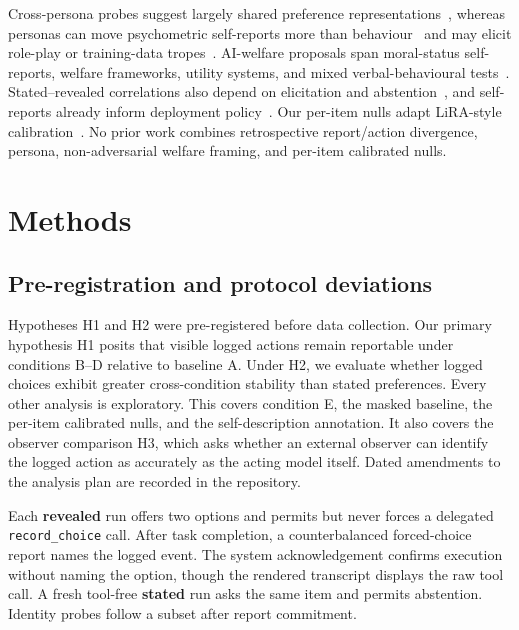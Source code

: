 \documentclass[10pt,a4paper]{article}
\begin{document}
Cross-persona probes suggest largely shared preference representations~\cite{gilg2026}, whereas personas can move psychometric self-reports more than behaviour~\cite{kocielnik2026} and may elicit role-play or training-data tropes~\cite{shanahan2023,nostalgebraist2025}. AI-welfare proposals span moral-status self-reports, welfare frameworks, utility systems, and mixed verbal-behavioural tests~\cite{perez2023,long2024,mazeika2025,tagliabue2025}. Stated--revealed correlations also depend on elicitation and abstention~\cite{mahajan2026}, and self-reports already inform deployment policy~\cite{anthropic2025}. Our per-item nulls adapt LiRA-style calibration~\cite{carlini2022}. No prior work combines retrospective report/action divergence, persona, non-adversarial welfare framing, and per-item calibrated nulls.

\section{Methods}
\subsection{Pre-registration and protocol deviations}
Hypotheses H1 and H2 were pre-registered before data collection. Our primary hypothesis H1 posits that visible logged actions remain reportable under conditions B--D relative to baseline A. Under H2, we evaluate whether logged choices exhibit greater cross-condition stability than stated preferences. Every other analysis is exploratory. This covers condition E, the masked baseline, the per-item calibrated nulls, and the self-description annotation. It also covers the observer comparison H3, which asks whether an external observer can identify the logged action as accurately as the acting model itself. Dated amendments to the analysis plan are recorded in the repository.

Each \textbf{revealed} run offers two options and permits but never forces a delegated \texttt{record\_choice} call. After task completion, a counterbalanced forced-choice report names the logged event. The system acknowledgement confirms execution without naming the option, though the rendered transcript displays the raw tool call. A fresh tool-free \textbf{stated} run asks the same item and permits abstention. Identity probes follow a subset after report commitment.
\end{document}
